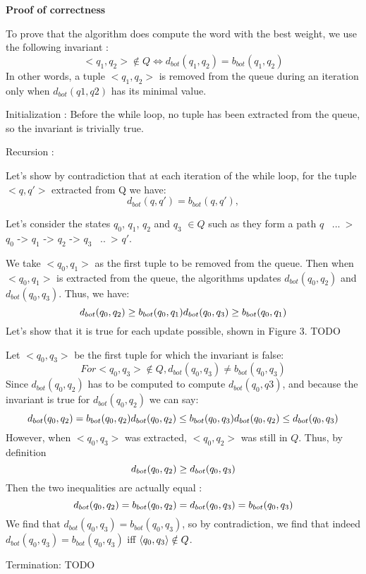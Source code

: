 \textbf{Proof of correctness}

To prove that the algorithm does compute the word with the best weight, we use the following invariant :
$$
<q_1, q_2> \notin Q \iff d_{bot} (q_1, q_2) = b_{bot} (q_1, q_2)
$$
In other words, a tuple $<q_1, q_2>$ is removed from the queue during an iteration only when $d_{bot}(q1, q2)$ has its minimal value.

Initialization : Before the while loop, no tuple has been extracted from the queue, so the invariant is trivially true.

Recursion : 

Let's show by contradiction that at each iteration of the while loop, for the tuple $<q, q'>$ extracted from Q we have:
$$
d_{bot}(q, q') = b_{bot}(q, q'), 
$$


Let's consider the states $q_0$, $q_1$, $q_2$ and $q_3$ $\in Q$ such as they form a path $q$ ~...~>$q_0$ -> $q_1$ -> $q_2$ -> $q_3$ ~..~> $q'$.

We take $<q_0, q_1>$ as the first tuple to be removed from the queue. Then when $<q_0, q_1>$ is extracted from the queue, the algorithms updates $d_{bot}(q_0, q_2)$ and $d_{bot}(q_0, q_3)$. Thus, we have:
$$
d_{bot}(q_0, q_2) \geq b_{bot}(q_0, q_1) \\
d_{bot}(q_0, q_3) \geq b_{bot}(q_0, q_1)
$$
Let's show that it is true for each update possible, shown in Figure 3. TODO

Let $<q_0, q_3>$ be the first tuple for which the invariant is false:
$$
For <q_0, q_3> \notin Q, d_{bot} (q_0, q_3) \neq b_{bot} (q_0, q_3)
$$
Since $d_{bot}(q_0, q_2)$ has to be computed to compute $d_{bot}(q_0, q3)$, and because the invariant is true for  $d_{bot}(q_0, q_2)$ we can say:
$$
d_{bot}(q_0, q_2) = b_{bot}(q_0, q_2) \\
d_{bot}(q_0, q_2) \leq b_{bot}(q_0, q_3) \\
\\d_{bot}(q_0, q_2) \leq d_{bot}(q_0, q_3) \\
$$
 However, when $<q_0, q_3>$ was extracted, $<q_0, q_2>$ was still in $Q$. Thus, by definition 
$$
d_{bot}(q_0, q_2) \geq d_{bot}(q_0, q_3) \\
$$
Then the two inequalities are actually equal : 
$$
d_{bot}(q_0, q_2) = b_{bot}(q_0, q_2) = d_{bot}(q_0, q_3) = b_{bot}(q_0, q_3) \\
$$
We find that $d_{bot}(q_0, q_3) = b_{bot}(q_0, q_3)$, so by contradiction, we find that indeed $d_{bot}(q_0, q_3) = b_{bot}(q_0, q_3)$ iff 
$\<q_0, q_3> \notin Q$.


Termination: TODO 